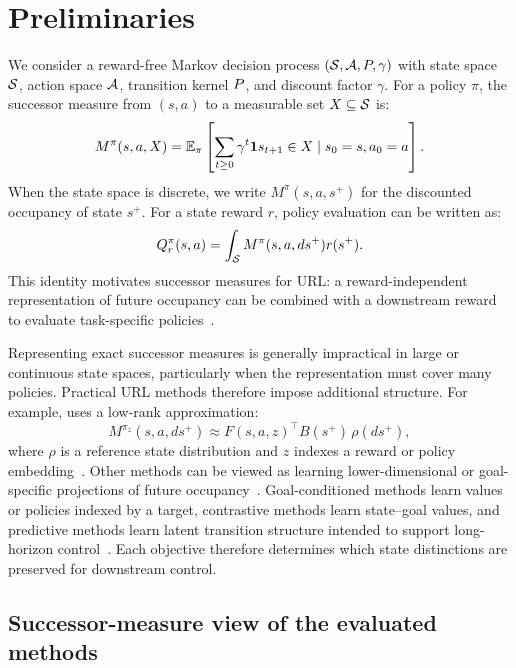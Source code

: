 \section{Preliminaries}

We consider a reward-free Markov decision process $(\mathcal{S},\mathcal{A},P,\gamma)$ with state space $\mathcal{S}$, action space $\mathcal{A}$, transition kernel $P$, and discount factor $\gamma$.
For a policy $\pi$, the successor measure from $(s,a)$ to a measurable set $X\subseteq\mathcal{S}$ is:
\begin{equation}
    M^\pi(s,a,X) = \mathbb{E}_\pi\left[ \sum_{t\geq 0}\gamma^t \mathbf{1}{s_{t+1}\in X} \mid s_0=s,a_0=a \right].
\end{equation}
When the state space is discrete, we write $M^\pi(s,a,s^+)$ for the discounted occupancy of state $s^+$.
For a state reward $r$, policy evaluation can be written as:
\begin{equation}
    Q^{\pi}_r(s,a) = \int_{\mathcal{S}} M^\pi(s,a,ds^+) r(s^+).
\end{equation}
This identity motivates successor measures for URL: a reward-independent representation of future occupancy can be combined with a downstream reward to evaluate task-specific policies~\citep{dayan-nc93a,touati-neurips21a,touati-iclr23a,agarwal-rlj25a}.

Representing exact successor measures is generally impractical in large or continuous state spaces, particularly when the representation must cover many policies. 
Practical URL methods therefore impose additional structure.
For example, \fb{} uses a low-rank approximation:
\begin{equation}
    M^{\pi_z}(s,a,ds^+) \approx F(s,a,z)^\top B(s^+)\,\rho(ds^+),
\end{equation}
where $\rho$ is a reference state distribution and $z$ indexes a reward or policy embedding~\citep{touati-neurips21a,touati-iclr23a}.
Other methods can be viewed as learning lower-dimensional or goal-specific projections of future occupancy~\citep{agarwal-rlj25a}.
Goal-conditioned methods learn values or policies indexed by a target, 
contrastive methods learn state–goal values, and predictive methods learn latent transition structure intended to support long-horizon control~\citep{eysenbach-iclr21a,eysenbach-neurips22a,ma-neurips22a}.
Each objective therefore determines which state distinctions are preserved for downstream control.

\subsection{Successor-measure view of the evaluated methods}
\label{sec:url_objectives_as_sm}

